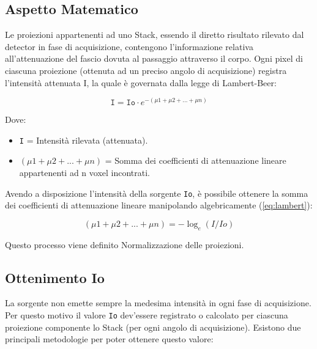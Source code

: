 \documentclass[a4paper,12pt, doubleside]{report}
\begin{document}
            \subsection{Aspetto Matematico}
                \label{sub:norm-math}
                \par
                    Le proiezioni appartenenti ad uno Stack, essendo il diretto risultato rilevato dal detector in fase di acquisizione, contengono l'informazione relativa all'attenuazione del fascio dovuta al passaggio attraverso il corpo. Ogni pixel di ciascuna proiezione (ottenuta ad un preciso angolo di acquisizione) registra l'intensità attenuata I, la quale è governata dalla legge di Lambert-Beer\cite{lambert-beer}:

                    \begin{equation} \label{eq:lambert}
                        \texttt{I} = \texttt{Io} \cdot e^{- (\mu1 + \mu2 + ...  + \mu n)}
                    \end{equation}
                    
                    Dove:
                    \begin{itemize}
                      \item \texttt{I} = Intensità rilevata (attenuata).
                      \item \texttt{$ (\mu1 + \mu2 + ... + \mu n) $} = Somma dei coefficienti di attenuazione lineare appartenenti ad n voxel incontrati.
                    \end{itemize}
                    
                \par
                    Avendo a disposizione l'intensità della sorgente \texttt{Io}, è possibile ottenere la somma dei coefficienti di attenuazione lineare manipolando algebricamente (\ref{eq:lambert}):
                    
                    \begin{equation} \label{eq:normalization}
                        (\mu1 + \mu2 + ... + \mu n) = - \log_e{(I/Io)}
                    \end{equation}
                    
                    Questo processo viene definito Normalizzazione delle proiezioni.
                
            \subsection{Ottenimento Io}
                \label{sub:io}
                \par
                    La sorgente non emette sempre la medesima intensità in ogni fase di acquisizione. Per questo motivo il valore \texttt{Io} dev'essere registrato o calcolato per ciascuna proiezione componente lo Stack (per ogni angolo di acquisizione).
                    Esistono due principali metodologie per poter ottenere questo valore:
               
\end{document}
